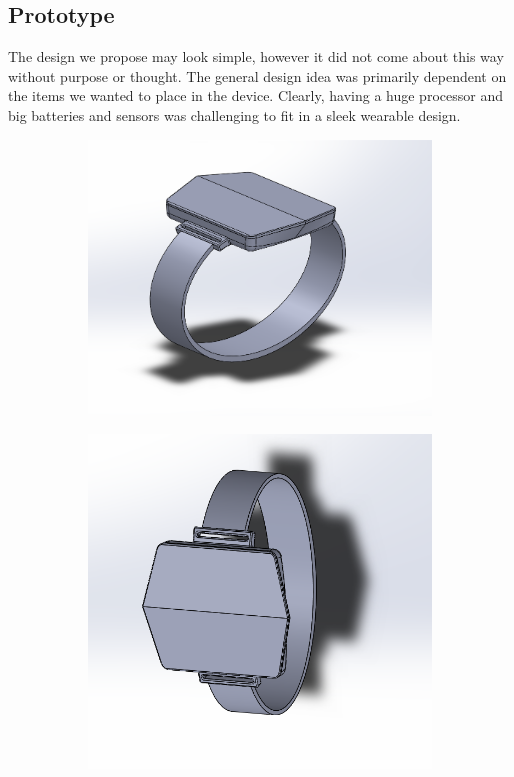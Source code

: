 \documentclass[12pt,letterpaper]{article}
\begin{document}
\subsection*{Prototype}
\hspace{1cm}The design we propose may look simple, however it did not come about this way without purpose or thought. The general design idea was primarily dependent on the items we wanted to place in the device. Clearly, having a huge processor and big batteries and sensors was challenging to fit in a sleek wearable design.\\

\begin{figure}
	\centering
	\begin{subfigure}{.5\textwidth}
		\centering
		\includegraphics[width=1\linewidth]{CaptureV1.png}
		\label{fig:sub1}
	\end{subfigure}%
	\begin{subfigure}{.5\textwidth}
		\centering
		\includegraphics[width=1\linewidth]{CaptureV5.png}

\end{subfigure}
\end{figure}
\end{document}
